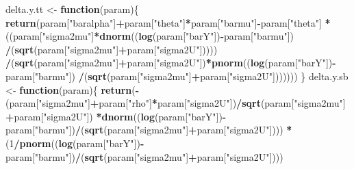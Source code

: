 \documentclass[]{book}
\newenvironment{Shaded}{\begin{snugshade}}{\end{snugshade}}
\newcommand{\ControlFlowTok}[1]{\textcolor[rgb]{0.13,0.29,0.53}{\textbf{#1}}}
\newcommand{\DecValTok}[1]{\textcolor[rgb]{0.00,0.00,0.81}{#1}}
\newcommand{\KeywordTok}[1]{\textcolor[rgb]{0.13,0.29,0.53}{\textbf{#1}}}
\newcommand{\NormalTok}[1]{#1}
\newcommand{\OperatorTok}[1]{\textcolor[rgb]{0.81,0.36,0.00}{\textbf{#1}}}
\newcommand{\StringTok}[1]{\textcolor[rgb]{0.31,0.60,0.02}{#1}}
\theoremstyle{definition}
\theoremstyle{definition}
\theoremstyle{definition}
\theoremstyle{remark}
\begin{document}
\begin{Shaded}
\begin{Highlighting}[]
\NormalTok{delta.y.tt <-}\StringTok{ }\ControlFlowTok{function}\NormalTok{(param)\{}
  \KeywordTok{return}\NormalTok{(param[}\StringTok{"baralpha"}\NormalTok{]}\OperatorTok{+}\NormalTok{param[}\StringTok{"theta"}\NormalTok{]}\OperatorTok{*}\NormalTok{param[}\StringTok{"barmu"}\NormalTok{]}\OperatorTok{-}\NormalTok{param[}\StringTok{"theta"}\NormalTok{]}
         \OperatorTok{*}\NormalTok{((param[}\StringTok{"sigma2mu"}\NormalTok{]}\OperatorTok{*}\KeywordTok{dnorm}\NormalTok{((}\KeywordTok{log}\NormalTok{(param[}\StringTok{"barY"}\NormalTok{])}\OperatorTok{-}\NormalTok{param[}\StringTok{"barmu"}\NormalTok{])}
                                    \OperatorTok{/}\NormalTok{(}\KeywordTok{sqrt}\NormalTok{(param[}\StringTok{"sigma2mu"}\NormalTok{]}\OperatorTok{+}\NormalTok{param[}\StringTok{"sigma2U"}\NormalTok{]))))}
           \OperatorTok{/}\NormalTok{(}\KeywordTok{sqrt}\NormalTok{(param[}\StringTok{"sigma2mu"}\NormalTok{]}\OperatorTok{+}\NormalTok{param[}\StringTok{"sigma2U"}\NormalTok{])}\OperatorTok{*}\KeywordTok{pnorm}\NormalTok{((}\KeywordTok{log}\NormalTok{(param[}\StringTok{"barY"}\NormalTok{])}\OperatorTok{-}\NormalTok{param[}\StringTok{"barmu"}\NormalTok{])}
                                                            \OperatorTok{/}\NormalTok{(}\KeywordTok{sqrt}\NormalTok{(param[}\StringTok{"sigma2mu"}\NormalTok{]}\OperatorTok{+}\NormalTok{param[}\StringTok{"sigma2U"}\NormalTok{]))))))}
\NormalTok{\}}
\NormalTok{delta.y.sb <-}\StringTok{ }\ControlFlowTok{function}\NormalTok{(param)\{}
  \KeywordTok{return}\NormalTok{(}\OperatorTok{-}\NormalTok{(param[}\StringTok{"sigma2mu"}\NormalTok{]}\OperatorTok{+}\NormalTok{param[}\StringTok{"rho"}\NormalTok{]}\OperatorTok{*}\NormalTok{param[}\StringTok{"sigma2U"}\NormalTok{])}\OperatorTok{/}\KeywordTok{sqrt}\NormalTok{(param[}\StringTok{"sigma2mu"}\NormalTok{]}\OperatorTok{+}\NormalTok{param[}\StringTok{"sigma2U"}\NormalTok{])}
         \OperatorTok{*}\KeywordTok{dnorm}\NormalTok{((}\KeywordTok{log}\NormalTok{(param[}\StringTok{"barY"}\NormalTok{])}\OperatorTok{-}\NormalTok{param[}\StringTok{"barmu"}\NormalTok{])}\OperatorTok{/}\NormalTok{(}\KeywordTok{sqrt}\NormalTok{(param[}\StringTok{"sigma2mu"}\NormalTok{]}\OperatorTok{+}\NormalTok{param[}\StringTok{"sigma2U"}\NormalTok{])))}
         \OperatorTok{*}\NormalTok{(}\DecValTok{1}\OperatorTok{/}\KeywordTok{pnorm}\NormalTok{((}\KeywordTok{log}\NormalTok{(param[}\StringTok{"barY"}\NormalTok{])}\OperatorTok{-}\NormalTok{param[}\StringTok{"barmu"}\NormalTok{])}\OperatorTok{/}\NormalTok{(}\KeywordTok{sqrt}\NormalTok{(param[}\StringTok{"sigma2mu"}\NormalTok{]}\OperatorTok{+}\NormalTok{param[}\StringTok{"sigma2U"}\NormalTok{])))}

\end{Highlighting}
\end{Shaded}
\end{document}
